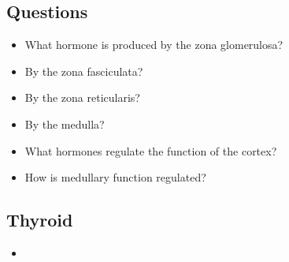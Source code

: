 \subsection{Questions}
\begin{itemize}\color{minor}
  \item What hormone is produced by the zona glomerulosa?
  \basec{\begin{itemize}
    \item 
  \end{itemize}}

  \item By the zona fasciculata?
  \basec{\begin{itemize}
    \item 
  \end{itemize}}
  
  \item By the zona reticularis?
  \basec{\begin{itemize}
    \item 
  \end{itemize}}
  
  \item By the medulla?
  \basec{\begin{itemize}
    \item 
  \end{itemize}}
  
  \item What hormones regulate the function of the cortex?
  \basec{\begin{itemize}
    \item 
  \end{itemize}}
  
  \item How is medullary function regulated?
  \basec{\begin{itemize}
    \item 
  \end{itemize}}

\end{itemize}

\subsection{Thyroid}
\begin{center}
\end{center}
\begin{itemize}
  \item 
\end{itemize}

